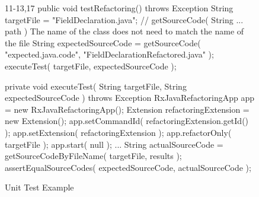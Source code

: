\begin{figure}[H]
\begin{sourcecode}
\begin{javacode}{11-13,17}
public void testRefactoring() throws Exception {
	String targetFile = "FieldDeclaration.java";
	// getSourceCode( String ... path ) The name of the class does not need to match the name of the file
	String expectedSourceCode = getSourceCode( "expected.java.code", "FieldDeclarationRefactored.java" );
	executeTest( targetFile, expectedSourceCode );
}

private void executeTest( String targetFile, String expectedSourceCode ) throws Exception {
	RxJavaRefactoringApp app = new RxJavaRefactoringApp();
	Extension refactoringExtension = new Extension();
	app.setCommandId( refactoringExtension.getId() );
	app.setExtension( refactoringExtension );
	app.refactorOnly( targetFile );
	app.start( null );
	...
	String actualSourceCode = getSourceCodeByFileName( targetFile, results );
	assertEqualSourceCodes( expectedSourceCode, actualSourceCode );
}
\end{javacode}
\caption{Unit Test Example}
\label{code:unit-test-example}
\end{sourcecode}
\end{figure}